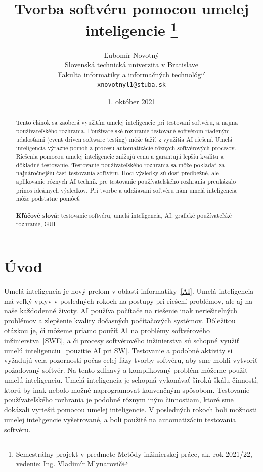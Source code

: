 \documentclass[10pt,twoside,slovak,a4paper]{article}
\title{Tvorba softvéru pomocou umelej inteligencie
\thanks{Semestrálny projekt v predmete Metódy inžinierskej práce, ak. rok 2021/22, vedenie: Ing. Vladimír Mlynarovič}} %
\author{Ľubomír Novotný\\[2pt]
	{\small Slovenská technická univerzita v Bratislave}\\
	{\small Fakulta informatiky a informačných technológií}\\
	{\small \texttt{xnovotnyl1@stuba.sk}}
	}
\date{\small 1. október 2021} %
\begin{document}
\maketitle

\begin{abstract}

 Tento článok sa zaoberá využitím umelej inteligencie pri testovaní softvéru, a najmä používateľského rozhrania. Používateľské rozhranie testované softvérom riadeným udalosťami (event driven software testing) môže ťažiť z využitia AI riešení. Umelá inteligencia výrazne pomohla procesu automatizácie rôznych softvérových procesov. Riešenia pomocou umelej inteligencie znižujú cenu a garantujú lepšiu kvalitu a dôkladné testovanie. Testovanie používateľského rozhrania sa môže pokladať za najnáročnejšiu časť testovania softvéru. Hoci výsledky sú dosť predbežné, ale aplikovanie rôznych AI techník pre testovanie používateľského rozhrania preukázalo prínos ideálnych výsledkov. Pri tvorbe a udržiavaní softvéru nám umelá inteligencia môže podstatne pomôcť.\\\\
 \textbf{Kľúčové slová:} testovanie softvéru, umelá inteligencia, AI, grafické používateľské rozhranie, GUI
\end{abstract}

\section{Úvod}

Umelá inteligencia je nový prelom v oblasti informatiky~\ref{AI}. Umelá inteligencia má veľký vplyv v posledných rokoch na postupy pri riešení problémov, ale aj na naše každodenné životy. AI používa počítače na riešenie inak neriešiteľných problémov a zlepšenie kvality dočasných počítačových systémov. Dôležitou otázkou je, či môžeme priamo použiť AI na problémy softvérového inžinierstva~\ref{SWE}, a či procesy softvérového inžinierstva sú schopné využiť umelú inteligenciu~\ref{pouzitie AI pri SW}.
Testovanie a podobné aktivity si vyžadujú veľa pozornosti počas celej fázy tvorby softvéru, aby sme mohli vytvoriť požadovaný softvér. Na tento zdĺhavý a komplikovaný problém môžeme použiť umelú inteligenciu.  Umelá inteligencia je schopná vykonávať širokú škálu činností, ktorú by inak nebolo možné naprogramovať konvenčným spôsobom. Testovanie používateľského rozhrania je podobné rôznym iným činnostiam, ktoré sme dokázali vyriešiť pomocou umelej inteligencie. V posledných rokoch boli možnosti umelej inteligencie vyšetrované, a boli použité na automatizáciu testovania softvéru.
\end{document}
